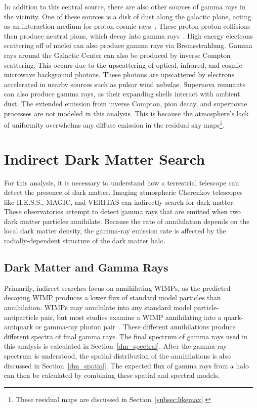  In addition to this central source, there are also other sources of gamma rays in the vicinity.
  One of these sources is a disk of dust along the galactic plane, acting as an interaction medium for proton cosmic rays~\cite{diffusegamma1989}.
  These proton-proton collisions then produce neutral pions, which decay into gamma rays~\cite{hess_gc_diffuse}.
  High energy electrons scattering off of nuclei can also produce gamma rays via Bremsstrahlung.
  Gamma rays around the Galactic Center can also be produced by inverse Compton scattering.
  This occurs due to the upscattering of optical, infrared, and cosmic microwave background photons.
  These photons are upscattered by electrons accelerated in nearby sources such as pulsar wind nebulae.
  Supernova remnants can also produce gamma rays, as their expanding shells interact with ambient dust. 
  The extended emission from inverse Compton, pion decay, and supernovae processes are not modeled in this analysis.
  This is because the atmosphere's lack of uniformity overwhelms any diffuse emission in the residual sky maps\footnote{These residual maps are discussed in Section~\ref{subsec:likemax}.}.


\section{Indirect Dark Matter Search}
  For this analysis, it is necessary to understand how a terrestrial telescope can detect the presence of dark matter.
  Imaging atmospheric Cherenkov telescopes like H.E.S.S., MAGIC, and VERITAS can indirectly search for dark matter.
  These observatories attempt to detect gamma rays that are emitted when two dark matter particles annihilate.
  Because the rate of annihilation depends on the local dark matter density, the gamma-ray emission rate is affected by the radially-dependent structure of the dark matter halo.

  \subsection{Dark Matter and Gamma Rays}
    Primarily, indirect searches focus on annihilating WIMPs, as the predicted decaying WIMP produces a lower flux of standard model particles than annihilation.
    WIMPs may annihilate into any standard model particle-antiparticle pair, but most studies examine a WIMP annihilating into a quark-antiquark or gamma-ray photon pair~\cite{pdg2016}.
    These different annihilations produce different spectra of final gamma rays.
    The final spectrum of gamma rays used in this analysis is calculated in Section~\ref{dm_spectral}.
    After the gamma-ray spectrum is understood, the spatial distribution of the annihilations is also discussed in Section~\ref{dm_spatial}.
    The expected flux of gamma rays from a halo can then be calculated by combining these spatial and spectral models.
  
